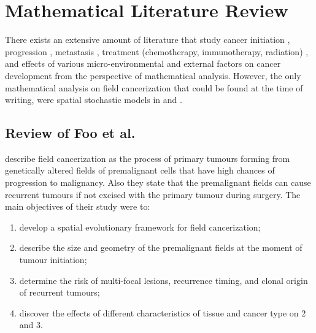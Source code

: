 \documentclass[\main/thesis.tex]{subfiles}
\begin{document}
\section{Mathematical Literature Review}
There exists an extensive amount of literature that study cancer initiation \cite{Durrett, Gentry, Paterson}, progression \cite{Beerenwinkel, Enderling}, metastasis \cite{Franssen}, treatment (chemotherapy, immunotherapy, radiation) \cite{dePillis, Radunskaya, Enderling}, and effects of various micro-environmental and external factors on cancer development \cite{Gerlee} from the perspective of mathematical analysis. However, the only mathematical analysis on field cancerization that could be found at the time of writing, were spatial stochastic models in \textcite{Foo} and \textcite{Ryser}.

\subsection{Review of Foo et al.}
\textcite{Foo} describe field cancerization as the process of primary tumours forming from genetically altered fields of premalignant cells that have high chances of progression to malignancy. Also they state that the premalignant fields can cause recurrent tumours if not excised with the primary tumour during surgery. The main objectives of their study were to:
\begin{enumerate}
  \item develop a spatial evolutionary framework for field cancerization;
  \item describe the size and geometry of the premalignant fields at the moment 
        of tumour initiation;
  \item determine the risk of multi-focal lesions, recurrence timing, and clonal 
        origin of recurrent tumours;
  \item discover the effects of different characteristics of tissue and cancer 
        type on 2 and 3.
\end{enumerate}
\end{document}
